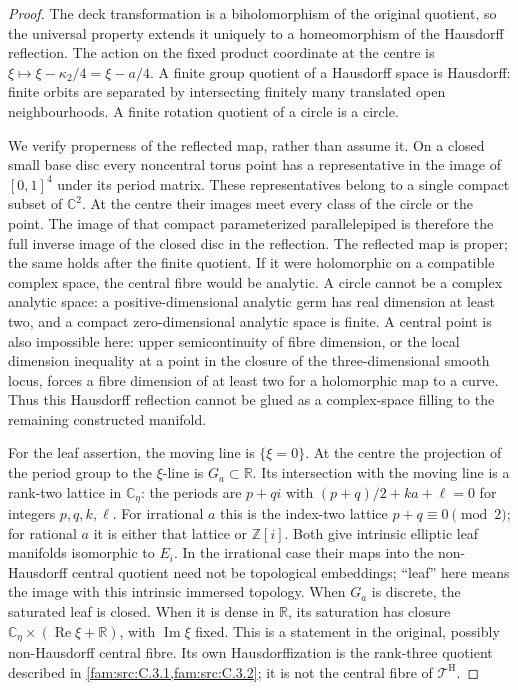 \begin{proof}
The deck transformation is a biholomorphism of the original quotient,
so the universal property extends it uniquely to a homeomorphism of
the Hausdorff reflection. The action on the fixed product coordinate
at the centre is \(\xi\mapsto\xi-\kappa_2/4=\xi-a/4\).
A finite group quotient of a Hausdorff space is Hausdorff: finite
orbits are separated by intersecting finitely many translated open
neighbourhoods. A finite rotation quotient of a circle is a circle.

We verify properness of the reflected map, rather than assume it.
On a closed small base disc every noncentral torus point has a
representative in the image of \([0,1]^4\) under its period matrix.
These representatives belong to a single compact subset of
\(\mathbb C^2\). At the centre their images meet every class of the
circle or the point. The image of that compact parameterized
parallelepiped is therefore the full inverse image of the closed
disc in the reflection. The reflected map is proper; the same holds
after the finite quotient. If it were holomorphic on a compatible
complex space, the central fibre would be analytic. A circle cannot
be a complex analytic space: a positive-dimensional analytic germ
has real dimension at least two, and a compact zero-dimensional
analytic space is finite. A central point is also impossible here:
upper semicontinuity of fibre dimension, or the local dimension
inequality at a point in the closure of the three-dimensional smooth
locus, forces a fibre dimension of at least two for a holomorphic
map to a curve. Thus this Hausdorff reflection cannot be glued as a
complex-space filling to the remaining constructed manifold.

For the leaf assertion, the moving line is \(\{\xi=0\}\).
At the centre the projection of the period group to the \(\xi\)-line
is \(G_a\subset\mathbb R\). Its intersection with the moving line
is a rank-two lattice in \(\mathbb C_\eta\): the periods are
\(p+qi\) with \((p+q)/2+ka+\ell=0\) for integers
\(p,q,k,\ell\). For irrational \(a\) this is the index-two lattice
\(p+q\equiv0\pmod2\); for rational \(a\) it is either that lattice
or \(\mathbb Z[i]\). Both give intrinsic elliptic leaf manifolds isomorphic to
\(E_i\). In the irrational case their maps into the non-Hausdorff
central quotient need not be topological embeddings; ``leaf'' here
means the image with this intrinsic immersed topology. When \(G_a\)
is discrete, the saturated leaf is closed.
When it is dense in \(\mathbb R\), its saturation has closure
\(\mathbb C_\eta\times(\operatorname{Re}\xi+\mathbb R)\), with
\(\operatorname{Im}\xi\) fixed. This is a statement in the original,
possibly non-Hausdorff central fibre. Its own Hausdorffization is the
rank-three quotient described in \cref{fam:src:C.3.1,fam:src:C.3.2}; it is not the central fibre of
\(\mathcal T^{\mathrm H}\).
\end{proof}

